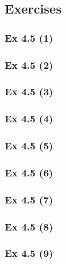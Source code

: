 \subsection*{Exercises}\label{sec:4.5_Exercises}

\subsubsection{Ex 4.5 (1)}\label{sec:Ex_4.5.1}

\subsubsection{Ex 4.5 (2)}\label{sec:Ex_4.5.2}

\subsubsection{Ex 4.5 (3)}\label{sec:Ex_4.5.3}

\subsubsection{Ex 4.5 (4)}\label{sec:Ex_4.5.4}

\subsubsection{Ex 4.5 (5)}\label{sec:Ex_4.5.5}

\subsubsection{Ex 4.5 (6)}\label{sec:Ex_4.5.6}

\subsubsection{Ex 4.5 (7)}\label{sec:Ex_4.5.7}

\subsubsection{Ex 4.5 (8)}\label{sec:Ex_4.5.8}

\subsubsection{Ex 4.5 (9)}\label{sec:Ex_4.5.9}


